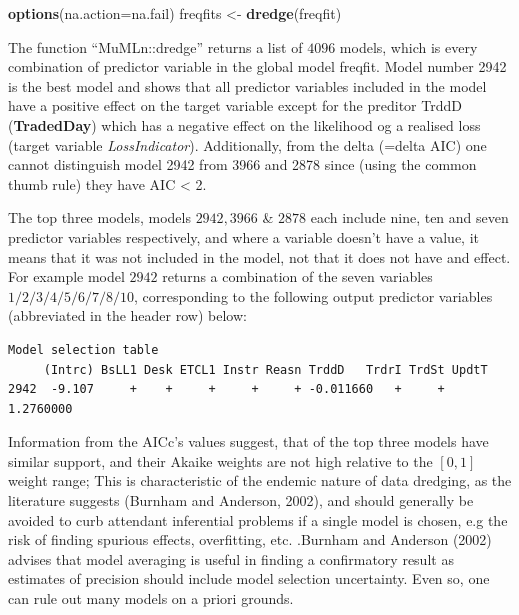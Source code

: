 \documentclass[]{DissertateUSU}
\newenvironment{Shaded}{\begin{snugshade}}{\end{snugshade}}
\newcommand{\KeywordTok}[1]{\textcolor[rgb]{0.13,0.29,0.53}{\textbf{#1}}}
\newcommand{\DataTypeTok}[1]{\textcolor[rgb]{0.13,0.29,0.53}{#1}}
\newcommand{\StringTok}[1]{\textcolor[rgb]{0.31,0.60,0.02}{#1}}
\newcommand{\NormalTok}[1]{#1}
\begin{document}
\singlespacing

\begin{Shaded}
\begin{Highlighting}[]
\KeywordTok{options}\NormalTok{(}\DataTypeTok{na.action=}\NormalTok{na.fail)}
\NormalTok{freqfits <-}\StringTok{ }\KeywordTok{dredge}\NormalTok{(freqfit)}
\end{Highlighting}
\end{Shaded}

\doublespacing

The function ``MuMLn::dredge'' returns a list of \(4096\) models, which
is every combination of predictor variable in the global model freqfit.
Model number 2942 is the best model and shows that all predictor
variables included in the model have a positive effect on the target
variable except for the preditor TrddD (\textbf{TradedDay}) which has a
negative effect on the likelihood og a realised loss (target variable
\emph{LossIndicator}). Additionally, from the delta (=delta AIC) one
cannot distinguish model 2942 from 3966 and 2878 since (using the common
thumb rule) they have AIC \textless{} 2.\medskip

The top three models, models \(2942, 3966\) \& \(2878\) each include
nine, ten and seven predictor variables respectively, and where a
variable doesn't have a value, it means that it was not included in the
model, not that it does not have and effect. For example model \(2942\)
returns a combination of the seven variables \(1/2/3/4/5/6/7/8/10\),
corresponding to the following output predictor variables (abbreviated
in the header row) below:

\singlespacing

\begin{verbatim}
Model selection table 
     (Intrc) BsLL1 Desk ETCL1 Instr Reasn TrddD   TrdrI TrdSt UpdtT 
2942  -9.107     +    +     +     +     + -0.011660   +     + 1.2760000 
\end{verbatim}

\doublespacing

Information from the AICc's values suggest, that of the top three models
have similar support, and their Akaike weights are not high relative to
the \([0,1]\) weight range; This is characteristic of the endemic nature
of data dredging, as the literature suggests (Burnham and Anderson,
2002), and should generally be avoided to curb attendant inferential
problems if a single model is chosen, e.g the risk of finding spurious
effects, overfitting, etc. .Burnham and Anderson (2002) advises that
model averaging is useful in finding a confirmatory result as estimates
of precision should include model selection uncertainty. Even so, one
can rule out many models on a priori grounds.\medskip    
\end{document}
